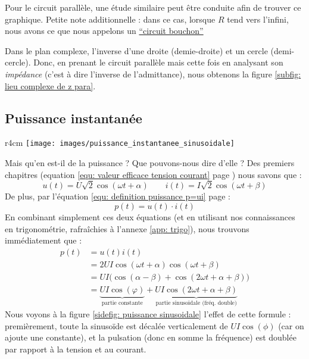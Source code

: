 \documentclass[12pt,a4paper]{article}
\newcommand{\ui}{\uline{I} }
\newcommand{\uu}{\uline{U} }
\begin{document}
Pour le circuit parallèle, une étude similaire peut être conduite afin de trouver ce graphique. Petite note additionnelle : dans ce cas, lorsque $R$ tend vers l'infini, nous avons ce que nous appelons un \uline{``circuit bouchon''}


\noindent{}

Dans le plan complexe, l'inverse d'une droite (demie-droite) et un cercle (demi-cercle). Donc, en prenant le circuit parallèle mais cette fois en analysant son \textit{impédance} (c'est à dire l'inverse de l'admittance), nous obtenons la figure \ref{subfig: lieu complexe de z para}.

\subsection{Puissance instantanée}
\begin{wrapfigure}{r}{4cm}
	\texttt{[image: images/puissance\_instantanee\_sinusoidale]}
	\caption{Graphe de la puissance}
	\label{sidefig: puissance sinusoidale}
\end{wrapfigure}
Mais qu'en est-il de la puissance ? Que pouvons-nous dire d'elle ? Des premiers chapitres (equation \ref{equ: valeur efficace tension courant} page \pageref{equ: valeur efficace tension courant}) nous savons que :
\[u(t) = U \sqrt{2}\cos(\omega t + \alpha) \qquad i(t) = I \sqrt{2}\cos(\omega t + \beta)\]
De plus, par l'équation \ref{equ: definition puissance p=ui} page \pageref{equ: definition puissance p=ui} :
\[p(t) = u(t)\cdot i(t)\]
En combinant simplement ces deux équations (et en utilisant nos connaissances en trigonométrie, rafraîchies à l'annexe \ref{app: trigo}), nous trouvons immédiatement que :\\ 
\begin{equation}
	\begin{array}{ll}
		p(t) 	& = u(t)i(t)\\
				& = 2UI\cos(\omega t + \alpha)\cos(\omega t + \beta)\\
				& = UI\big(\cos(\alpha - \beta) + \cos(2\omega t + \alpha + \beta)\big)\\
				& = \underbrace{UI\cos(\varphi)}_{\text{partie constante}} + \underbrace{UI\cos(2\omega t + \alpha + \beta)}_{\text{partie sinusoïdale (fréq. double)}}
	\end{array}
\end{equation}
Nous voyons à la figure \ref{sidefig: puissance sinusoidale} l'effet de cette formule : premièrement, toute la sinusoïde est décalée verticalement de $UI\cos(\phi)$ (car on ajoute une constante), et la pulsation (donc en somme la fréquence) est doublée par rapport à la tension et au courant. 
\end{document}
